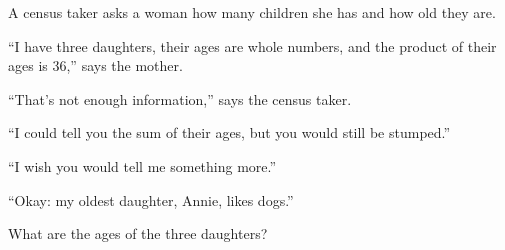 A census taker asks a woman how many children she has and how old they are.

``I have three daughters, their ages are whole numbers, and the product of their ages is $36$,'' says the mother.

``That's not enough information,'' says the census taker.

``I could tell you the sum of their ages, but you would still be stumped.''

``I wish you would tell me something more.''

``Okay: my oldest daughter, Annie, likes dogs.''

What are the ages of the three daughters?
